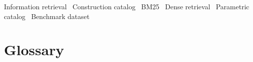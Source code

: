 \documentclass[preprint,12pt]{elsarticle}
\begin{document}
\begin{frontmatter}
\begin{abstract}
Dense embeddings therefore encode the domain well enough to localise a query within
the catalog, but not the parametric distinctions that carry cost implications. The
dataset, the exact query set, per-query outputs and all configurations are released.

\end{abstract}

\begin{keyword}
Information retrieval \ Construction catalog \ BM25 \ Dense retrieval \ Parametric catalog \ Benchmark dataset
\end{keyword}

\end{frontmatter}

\section*{Glossary}
\end{document}
